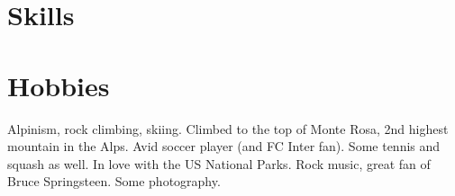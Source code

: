 \documentclass[a4paper]{moderncv}
\begin{document}
%
%
%
%
%
%
%
%

\section{Skills}


\section{Hobbies}
Alpinism, rock climbing, skiing. Climbed to the top of Monte Rosa, 2nd highest mountain in the Alps.
\newline{}
Avid soccer player (and FC Inter fan). Some tennis and squash as well. In love with the US National Parks.
\newline{}
Rock music, great fan of Bruce Springsteen. Some photography.%



 
\end{document}
